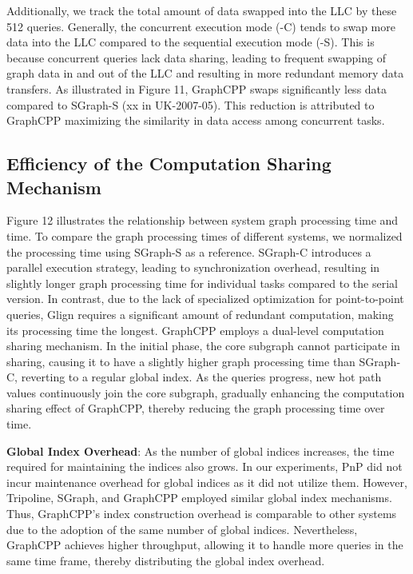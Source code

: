 \documentclass[lettersize,journal]{IEEEtran} %
\begin{document}
Additionally, we track the total amount of data swapped into the LLC by these 512 queries. Generally, the concurrent execution mode (-C) tends to swap more data into the LLC compared to the sequential execution mode (-S). This is because concurrent queries lack data sharing, leading to frequent swapping of graph data in and out of the LLC and resulting in more redundant memory data transfers. As illustrated in Figure 11, GraphCPP swaps significantly less data compared to SGraph-S (xx in UK-2007-05). This reduction is attributed to GraphCPP maximizing the similarity in data access among concurrent tasks.

\subsection{Efficiency of the Computation Sharing Mechanism}
Figure 12 illustrates the relationship between system graph processing time and time. To compare the graph processing times of different systems, we normalized the processing time using SGraph-S as a reference. SGraph-C introduces a parallel execution strategy, leading to synchronization overhead, resulting in slightly longer graph processing time for individual tasks compared to the serial version. In contrast, due to the lack of specialized optimization for point-to-point queries, Glign requires a significant amount of redundant computation, making its processing time the longest. GraphCPP employs a dual-level computation sharing mechanism. In the initial phase, the core subgraph cannot participate in sharing, causing it to have a slightly higher graph processing time than SGraph-C, reverting to a regular global index. As the queries progress, new hot path values continuously join the core subgraph, gradually enhancing the computation sharing effect of GraphCPP, thereby reducing the graph processing time over time.

{\bf{Global Index Overhead}}: As the number of global indices increases, the time required for maintaining the indices also grows. In our experiments, PnP did not incur maintenance overhead for global indices as it did not utilize them. However, Tripoline\cite{tripoline}, SGraph\cite{sgraph}, and GraphCPP employed similar global index mechanisms. Thus, GraphCPP's index construction overhead is comparable to other systems due to the adoption of the same number of global indices. Nevertheless, GraphCPP achieves higher throughput, allowing it to handle more queries in the same time frame, thereby distributing the global index overhead.
\end{document}
